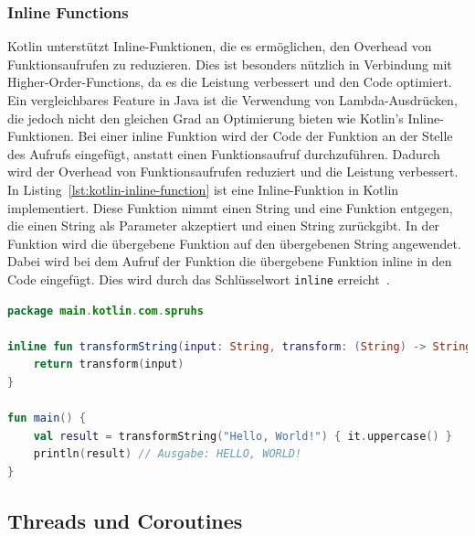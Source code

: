 \documentclass[11pt]{article}
\begin{document}
    \subsubsection{Inline Functions}
    Kotlin unterstützt Inline-Funktionen, die es ermöglichen, den Overhead von Funktionsaufrufen zu reduzieren.
    Dies ist besonders nützlich in Verbindung mit Higher-Order-Functions, da es die Leistung verbessert und den Code optimiert.
    Ein vergleichbares Feature in Java ist die Verwendung von Lambda-Ausdrücken, die jedoch nicht den gleichen Grad an Optimierung bieten wie Kotlin's Inline-Funktionen.
    Bei einer inline Funktion wird der Code der Funktion an der Stelle des Aufrufs eingefügt, anstatt einen Funktionsaufruf durchzuführen.
    Dadurch wird der Overhead von Funktionsaufrufen reduziert und die Leistung verbessert.
    In Listing~\ref{lst:kotlin-inline-function} ist eine Inline-Funktion in Kotlin implementiert.
    Diese Funktion nimmt einen String und eine Funktion entgegen, die einen String als Parameter akzeptiert und einen String zurückgibt.
    In der Funktion wird die übergebene Funktion auf den übergebenen String angewendet.
    Dabei wird bei dem Aufruf der Funktion die übergebene Funktion inline in den Code eingefügt.
    Dies wird durch das Schlüsselwort \texttt{inline} erreicht~\cite{kotlin-inline}.

    \begin{lstlisting}[language=Kotlin, caption={InlineFunction.java}, label={kotlin-inline-function}]
package main.kotlin.com.spruhs

inline fun transformString(input: String, transform: (String) -> String): String {
    return transform(input)
}

fun main() {
    val result = transformString("Hello, World!") { it.uppercase() }
    println(result) // Ausgabe: HELLO, WORLD!
}
    \end{lstlisting}

    \subsection{Threads und Coroutines}
\end{document}
